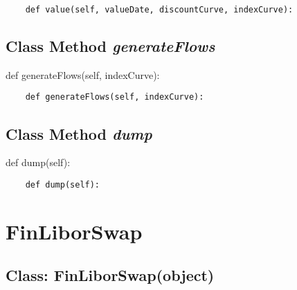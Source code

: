 \documentclass[twoside,11pt]{book}
\begin{document}
\begin{lstlisting}
    def value(self, valueDate, discountCurve, indexCurve):
\end{lstlisting}

\subsection{Class Method {\it generateFlows}}
def generateFlows(self, indexCurve):

\begin{lstlisting}
    def generateFlows(self, indexCurve):
\end{lstlisting}

\subsection{Class Method {\it dump}}
def dump(self):

\begin{lstlisting}
    def dump(self):
\end{lstlisting}

\newpage
\section{FinLiborSwap}

\subsection{Class: FinLiborSwap(object)}
\end{document}
